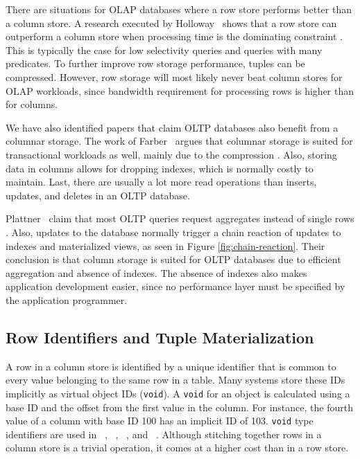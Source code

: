 There are situations for OLAP databases where a row store performs better than a column store. A research executed by Holloway \ea~shows that a row store can outperform a column store when processing time is the dominating constraint \cite{Holloway2008-rr}. This is typically the case for low selectivity queries and queries with many predicates. To further improve row storage performance, tuples can be compressed. However, row storage will most likely never beat column stores for OLAP workloads, since bandwidth requirement for processing rows is higher than for columns.

We have also identified papers that claim OLTP databases also benefit from a columnar storage. The work of Farber \ea~argues that columnar storage is suited for transactional workloads as well, mainly due to the compression \cite{Farber2012-vh}. Also, storing data in columns allows for dropping indexes, which is normally costly to maintain. Last, there are usually a lot more read operations than inserts, updates, and deletes in an OLTP database.

Plattner \ea~claim that most OLTP queries request aggregates instead of single rows \cite{Plattner2014-fr}. Also, updates to the database normally trigger a chain reaction of updates to indexes and materialized views, as seen in Figure \ref{fig:chain-reaction}. Their conclusion is that column storage is suited for OLTP databases due to efficient aggregation and absence of indexes. The absence of indexes also makes application development easier, since no performance layer must be specified by the application programmer. 

\subsection{Row Identifiers and Tuple Materialization}
\label{sub:Row Identifiers and Tuple Materialization}
A row in a column store is identified by a unique identifier that is common to every value belonging to the same row in a table. Many systems store these IDs implicitly as virtual object IDs (\texttt{void}). A \texttt{void} for an object is calculated using a base ID and the offset from the first value in the column. For instance, the fourth value of a column with base ID 100 has an implicit ID of 103. \texttt{void} type identifiers are used in \monetdb~\cite{Boncz2002-yj}, \cstore~\cite{Stonebraker2005-qz}, \vertica~\cite{Lamb2012-kg}, and \ibm~\cite{Raman2013-em}. Although stitching together rows in a column store is a trivial operation, it comes at a higher cost than in a row store. 

